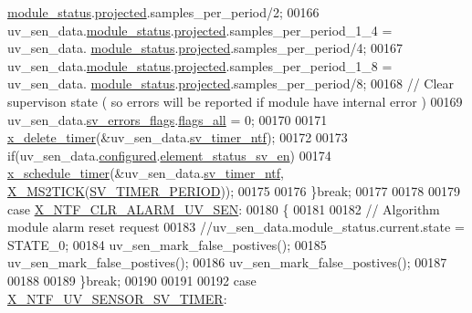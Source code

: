 \begin{DoxyCode}
      \hyperlink{a00035_a5a53c391562b059eb744ac679f3765ca}{module\_status}.\hyperlink{a00017_a6b2516d74583418cec324c50041421c9}{projected}.samples\_per\_period/2;
00166            uv\_sen\_data.\hyperlink{a00035_a5a53c391562b059eb744ac679f3765ca}{module\_status}.\hyperlink{a00017_a6b2516d74583418cec324c50041421c9}{projected}.samples\_per\_period\_1\_4  = uv\_sen\_data.
      \hyperlink{a00035_a5a53c391562b059eb744ac679f3765ca}{module\_status}.\hyperlink{a00017_a6b2516d74583418cec324c50041421c9}{projected}.samples\_per\_period/4;
00167            uv\_sen\_data.\hyperlink{a00035_a5a53c391562b059eb744ac679f3765ca}{module\_status}.\hyperlink{a00017_a6b2516d74583418cec324c50041421c9}{projected}.samples\_per\_period\_1\_8  = uv\_sen\_data.
      \hyperlink{a00035_a5a53c391562b059eb744ac679f3765ca}{module\_status}.\hyperlink{a00017_a6b2516d74583418cec324c50041421c9}{projected}.samples\_per\_period/8;
00168             \textcolor{comment}{// Clear supervison state ( so errors will be reported if module have internal error )}
00169           uv\_sen\_data.\hyperlink{a00035_aaeec6b0609dba31393f337abf1cce3d3}{sv\_errors\_flags}.\hyperlink{a00022_a1caa87b00c878186140c3bac9c8acf3b}{flags\_all} = 0;
00170 
00171           \hyperlink{a00036_ab69e9af4cfa717e870d587906283635c}{x\_delete\_timer}(&uv\_sen\_data.\hyperlink{a00035_ada91b200053f2d93e3639dc4ee3415b4}{sv\_timer\_ntf});
00172 
00173           \textcolor{keywordflow}{if}(uv\_sen\_data.\hyperlink{a00035_a94b2d1f6ea4ab334c74d24984dd27843}{configured}.\hyperlink{a00021_afeb3f74725269028a60926f98890c22b}{element\_status\_sv\_en})
00174           \hyperlink{a00036_a9e3befaa21e83f196f74201deed85346}{x\_schedule\_timer}(&uv\_sen\_data.\hyperlink{a00035_ada91b200053f2d93e3639dc4ee3415b4}{sv\_timer\_ntf},
      \hyperlink{a00036_a1732cd929c486b3a225824bb2b3dba36}{X\_MS2TICK}(\hyperlink{a00023_a8a535456285f4602701c814d7b69cc68}{SV\_TIMER\_PERIOD}));
00175 
00176         \}\textcolor{keywordflow}{break};
00177 
00178 
00179         \textcolor{keywordflow}{case} \hyperlink{a00021_a1127762abb3a1aeb79d23421b2f00493}{X\_NTF\_CLR\_ALARM\_UV\_SEN}:
00180         \{
00181 
00182            \textcolor{comment}{// Algorithm module alarm reset request}
00183              \textcolor{comment}{//uv\_sen\_data.module\_status.current.state = STATE\_0;}
00184              uv\_sen\_mark\_false\_postives();
00185              uv\_sen\_mark\_false\_postives();
00186              uv\_sen\_mark\_false\_postives();
00187 
00188 
00189         \}\textcolor{keywordflow}{break};
00190 
00191 
00192         \textcolor{keywordflow}{case} \hyperlink{a00035_a2ab2f7f60fff32ecaf2859625e76a868}{X\_NTF\_UV\_SENSOR\_SV\_TIMER}:

\end{DoxyCode}
